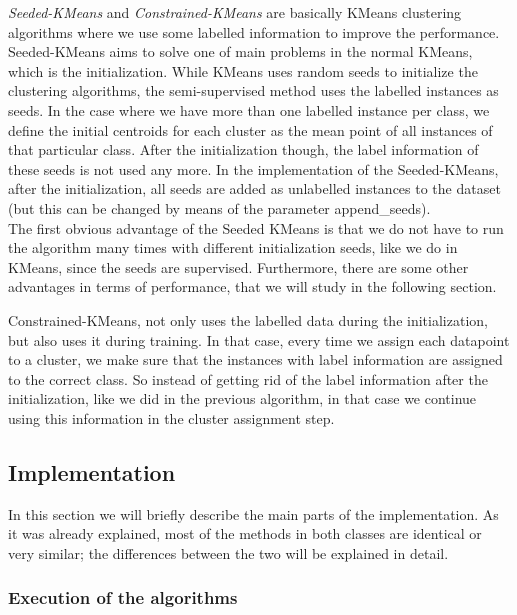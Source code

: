 \documentclass[11pt]{article}
\begin{document}
\textit{Seeded-KMeans} and \textit{Constrained-KMeans} are basically KMeans clustering algorithms where we use some labelled information to improve the performance.\\
Seeded-KMeans aims to solve one of main problems in the normal KMeans, which is the initialization. While KMeans uses random seeds to initialize the clustering algorithms, the semi-supervised method uses the labelled instances as seeds. In the case where we have more than one labelled instance per class, we define the initial centroids for each cluster as the mean point of all instances of that particular class. After the initialization though, the label information of these seeds is not used any more. In the implementation of the Seeded-KMeans, after the initialization, all seeds are added as unlabelled instances to the dataset (but this can be changed by means of the parameter append\_seeds).\\
The first obvious advantage of the Seeded KMeans is that we do not have to run the algorithm many times with different initialization seeds, like we do in KMeans, since the seeds are supervised. Furthermore, there are some other advantages in terms of performance, that we will study in the following section. 

Constrained-KMeans, not only uses the labelled data during the initialization, but also uses it during training. In that case, every time we assign each datapoint to a cluster, we make sure that the instances with label information are assigned to the correct class. So instead of getting rid of the label information after the initialization, like we did in the previous algorithm, in that case we continue using this information in the cluster assignment step.

\subsection{Implementation}

In this section we will briefly describe the main parts of the implementation. As it was already explained, most of the methods in both classes are identical or very similar; the differences between the two will be explained in detail. 

\subsubsection{Execution of the algorithms}
\end{document}
